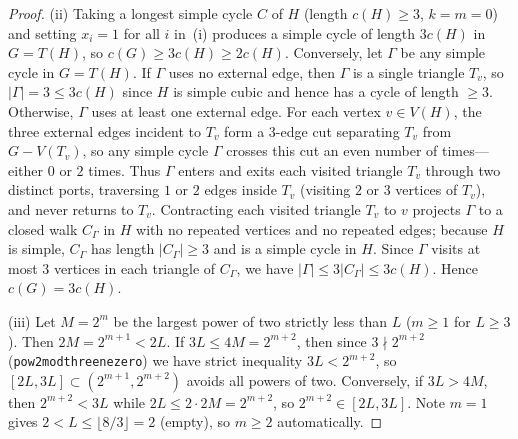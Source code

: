 \documentclass[11pt,reqno]{amsart}
\theoremstyle{plain}
\theoremstyle{definition}
\theoremstyle{remark}
\DeclareRobustCommand{\_}{\ifmmode\text{\textunderscore}\else\textunderscore\allowbreak\fi}
\begin{document}
\begin{proof}
(ii) Taking a longest simple cycle $C$ of $H$ (length $c(H) \ge 3$, $k = m = 0$) and setting $x_i = 1$ for all $i$ in~(i) produces a simple cycle of length $3c(H)$ in $G = T(H)$, so $c(G) \ge 3c(H) \ge 2c(H)$. Conversely, let $\Gamma$ be any simple cycle in $G = T(H)$. If $\Gamma$ uses no external edge, then $\Gamma$ is a single triangle $T_v$, so $|\Gamma| = 3 \le 3 c(H)$ since $H$ is simple cubic and hence has a cycle of length $\ge 3$. Otherwise, $\Gamma$ uses at least one external edge. For each vertex $v \in V(H)$, the three external edges incident to $T_v$ form a $3$-edge cut separating $T_v$ from $G - V(T_v)$, so any simple cycle $\Gamma$ crosses this cut an even number of times---either $0$ or $2$ times. Thus $\Gamma$ enters and exits each visited triangle $T_v$ through two distinct ports, traversing $1$ or $2$ edges inside $T_v$ (visiting $2$ or $3$ vertices of $T_v$), and never returns to $T_v$. Contracting each visited triangle $T_v$ to $v$ projects $\Gamma$ to a closed walk $C_\Gamma$ in $H$ with no repeated vertices and no repeated edges; because $H$ is simple, $C_\Gamma$ has length $|C_\Gamma| \ge 3$ and is a simple cycle in $H$. Since $\Gamma$ visits at most $3$ vertices in each triangle of $C_\Gamma$, we have $|\Gamma| \le 3|C_\Gamma| \le 3 c(H)$. Hence $c(G) = 3c(H)$.

(iii) Let $M = 2^m$ be the largest power of two strictly less than $L$ ($m \ge 1$ for $L \ge 3$). Then $2M = 2^{m+1} < 2L$. If $3L \le 4M = 2^{m+2}$, then since $3 \nmid 2^{m+2}$ (\texttt{pow2\_mod\_three\_ne\_zero}) we have strict inequality $3L < 2^{m+2}$, so $[2L, 3L] \subset (2^{m+1}, 2^{m+2})$ avoids all powers of two. Conversely, if $3L > 4M$, then $2^{m+2} < 3L$ while $2L \le 2 \cdot 2M = 2^{m+2}$, so $2^{m+2} \in [2L, 3L]$. Note $m = 1$ gives $2 < L \le \lfloor 8/3 \rfloor = 2$ (empty), so $m \ge 2$ automatically.
\end{proof}
\end{document}
